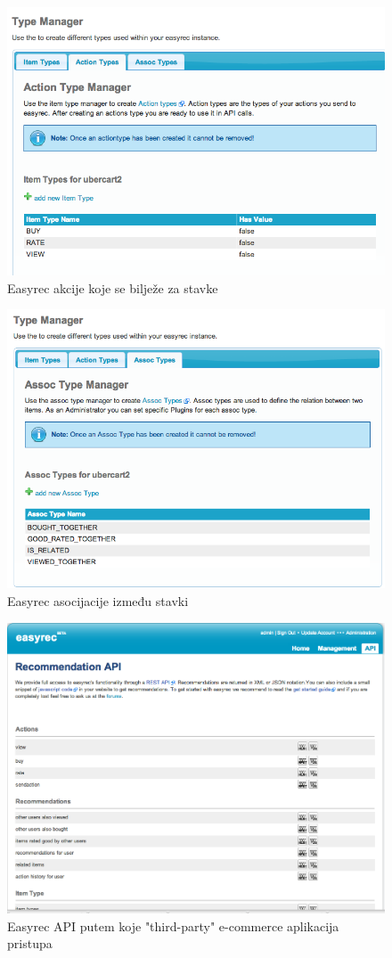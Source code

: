 \documentclass[times, utf8, seminar]{fit}
\begin{document}
{{{\begin{figure}[H]
\centering
\includegraphics[width=12cm]{img/easyrec_7_item_actions.png}
\caption{Easyrec akcije koje se bilježe za stavke}
\end{figure}

\begin{figure}[H]
\centering
\includegraphics[width=12cm]{img/easyrec_8_item_assoc.png}
\caption{Easyrec asocijacije između stavki}
\end{figure}

\begin{figure}[H]
\centering
\includegraphics[width=12cm]{img/easyrec_9_recommend_api.png}
\caption{Easyrec API putem koje "third-party" e-commerce aplikacija pristupa}
\end{figure}

}}}
\end{document}
